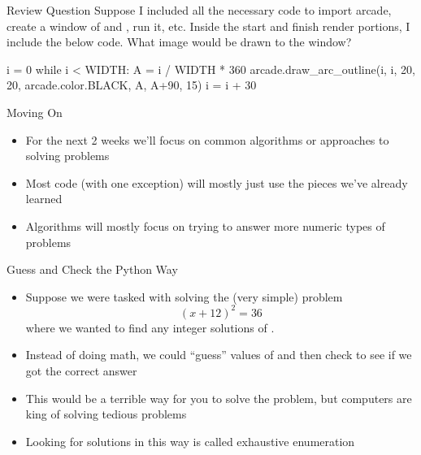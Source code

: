 \documentclass[pdf, aspectratio=169, 12pt]{beamer}
\begin{document}
\begin{frame}[fragile]{Review Question}
	\vspace{5mm}
	Suppose I included all the necessary code to import arcade, create a window of  and , run it, etc. Inside the start and finish render portions, I include the below code. What image would be drawn to the window?
	\footnotesize
	\begin{pythoncode}
		i = 0
		while i < WIDTH:
			A = i / WIDTH * 360
			arcade.draw_arc_outline(i, i, 20, 20, arcade.color.BLACK, 
											A, A+90, 15)
			i = i + 30
	\end{pythoncode}
	\begin{center}
	\end{center}
\end{frame}

\begin{frame}{Moving On}
	\begin{itemize}
		\item For the next 2 weeks we'll focus on common algorithms or approaches to solving problems
		\item Most code (with one exception) will mostly just use the pieces we've already learned
		\item Algorithms will mostly focus on trying to answer more numeric types of problems
	\end{itemize}
\end{frame}

\begin{frame}{Guess and Check the Python Way}
	\begin{itemize}[<+->]
		\item Suppose we were tasked with solving the (very simple) problem
			\[(x + 12)^2 = 36\]
			where we wanted to find any integer solutions of .
		\item Instead of doing math, we could ``guess'' values of  and then check to see if we got the correct answer
		\item This would be a terrible way for \alert{you} to solve the problem, but computers are king of solving tedious problems
		\item Looking for solutions in this way is called \alert{exhaustive enumeration}
	\end{itemize}
\end{frame}
\end{document}
